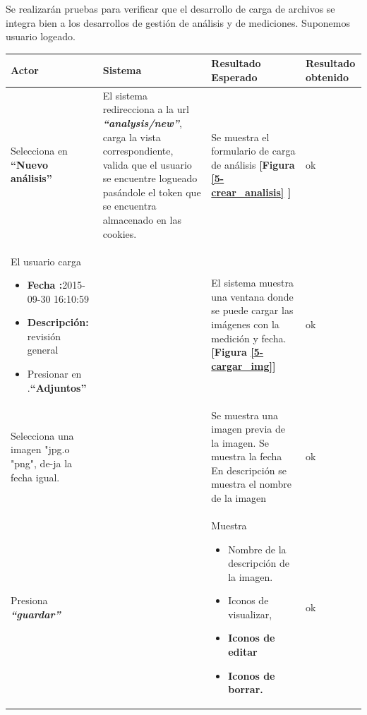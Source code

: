 \documentclass[a4paper,12pt]{article}
\begin{document}
Se realizarán pruebas para verificar que el desarrollo de carga de archivos se integra bien a los desarrollos de gestión de análisis y de mediciones. Suponemos usuario logeado.

\begin{longtable}{|p{4cm}|p{4cm}|p{4cm}|p{3cm}|}
\hline
Actor  & Sistema& Resultado Esperado & Resultado obtenido \\ \hline

Selecciona en \textbf{``Nuevo análisis'' }
& El sistema redirecciona a la url \textit{\textbf{``analysis/new''}}, carga la vista correspondiente, valida que el usuario se encuentre logueado pasándole el token que se encuentra almacenado en las cookies.

& Se muestra el formulario de carga de análisis \textbf{[Figura \ref{5-crear_analisis} ]}
& ok
\\ \hline



El usuario carga

\begin{itemize}
	\item \textbf{Fecha :}2015-09-30 16:10:59
	\item \textbf{Descripción: }revisión general
	\item Presionar en .\textbf{``Adjuntos''}

\end{itemize}

&
& El sistema muestra una ventana donde se puede cargar las imágenes con la medición y fecha.\textbf{ [Figura  \ref{5-cargar_img}]}
&ok

\\ \hline



Selecciona una imagen "jpg.o "png", de-ja la fecha igual. 
&
& Se muestra una imagen previa de la imagen. Se muestra la fecha En descripción se muestra el nombre de la imagen
& ok
\\ \hline
 
 

Presiona \textbf{\textit{``guardar''}}
&
& Muestra
\begin{itemize}
	\item Nombre de la descripción de la imagen.
	\item Iconos de visualizar,
	\item \textbf{Iconos de editar}
	\item \textbf{Iconos de borrar.}
\end{itemize}
& ok
\\ \hline






\end{longtable}
\end{document}
